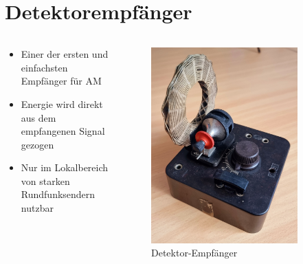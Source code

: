 
\section{Detektorempfänger}
\label{section:detektorempfänger}
\begin{frame}%

\begin{columns}
    \begin{column}{0.48\textwidth}
    \begin{itemize}
  \item Einer der ersten und einfachsten Empfänger für AM
  \item Energie wird direkt aus dem empfangenen Signal gezogen
  \item Nur im Lokalbereich von starken Rundfunksendern nutzbar
  \end{itemize}

    \end{column}
   \begin{column}{0.48\textwidth}
       
\begin{figure}
    \includegraphics[width=0.85\textwidth]{foto/193}
    \caption{\scriptsize Detektor-Empfänger}
    \label{am_detektor}
\end{figure}

   \end{column}
\end{columns}

\end{frame}


